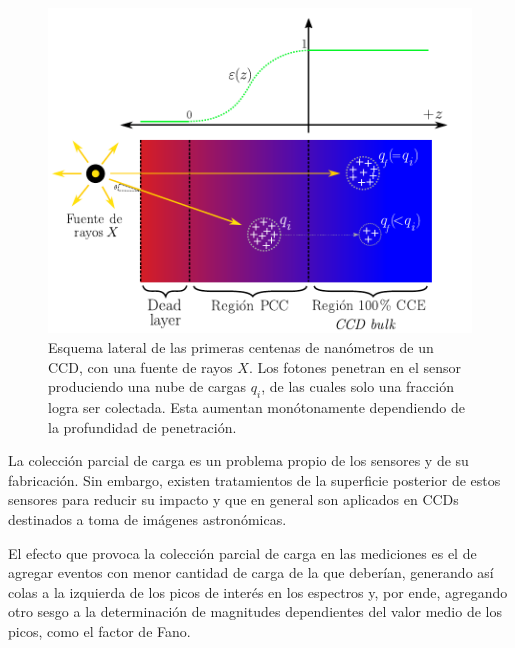 \begin{figure}%
    \centering
        \includegraphics[scale=.8]{Figs/PCC.pdf}
    \caption{Esquema lateral de las primeras centenas de nanómetros de un CCD, con una fuente de rayos $X$\cite{PCC-CCE}. Los fotones penetran en el sensor produciendo una nube de cargas $q_{i}$, de las cuales solo una fracción logra ser colectada. Esta aumentan monótonamente dependiendo de la profundidad de penetración.}
    \label{fig:PCC}
\end{figure}
La colección parcial de carga es un problema propio de los sensores y de su fabricación. Sin embargo, existen tratamientos de la superficie posterior de estos sensores para reducir su impacto y que en general son aplicados en CCDs destinados a toma de imágenes astronómicas. 

El efecto que provoca la colección parcial de carga en las mediciones es el de agregar eventos con menor cantidad de carga de la que deberían, generando así colas a la izquierda de los picos de interés en los espectros y, por ende, agregando otro sesgo a la determinación de magnitudes dependientes del valor medio de los picos, como el factor de Fano.


